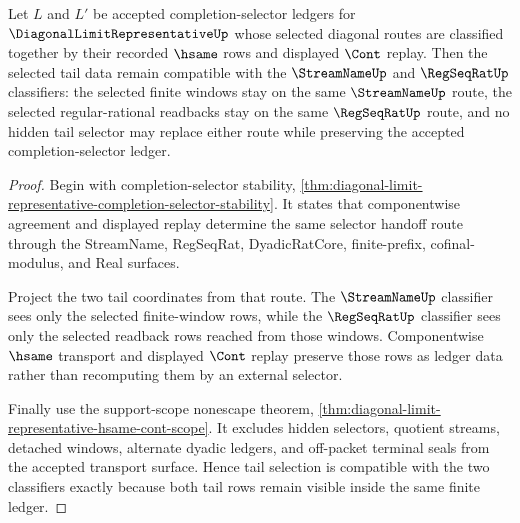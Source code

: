 \begin{theorem}
\label{thm:diagonal-limit-representative-tail-selector-compatibility}
Let $L$ and $L'$ be accepted completion-selector ledgers for $\DiagonalLimitRepresentativeUp$ whose selected diagonal routes are classified together by their recorded $\hsame$ rows and displayed $\Cont$ replay. Then the selected tail data remain compatible with the $\StreamNameUp$ and $\RegSeqRatUp$ classifiers: the selected finite windows stay on the same $\StreamNameUp$ route, the selected regular-rational readbacks stay on the same $\RegSeqRatUp$ route, and no hidden tail selector may replace either route while preserving the accepted completion-selector ledger.
\end{theorem}
\begin{proof}
Begin with completion-selector stability, \autoref{thm:diagonal-limit-representative-completion-selector-stability}. It states that componentwise agreement and displayed replay determine the same selector handoff route through the StreamName, RegSeqRat, DyadicRatCore, finite-prefix, cofinal-modulus, and Real surfaces.

Project the two tail coordinates from that route. The $\StreamNameUp$ classifier sees only the selected finite-window rows, while the $\RegSeqRatUp$ classifier sees only the selected readback rows reached from those windows. Componentwise $\hsame$ transport and displayed $\Cont$ replay preserve those rows as ledger data rather than recomputing them by an external selector.

Finally use the support-scope nonescape theorem, \autoref{thm:diagonal-limit-representative-hsame-cont-scope}. It excludes hidden selectors, quotient streams, detached windows, alternate dyadic ledgers, and off-packet terminal seals from the accepted transport surface. Hence tail selection is compatible with the two classifiers exactly because both tail rows remain visible inside the same finite ledger.
\end{proof}

